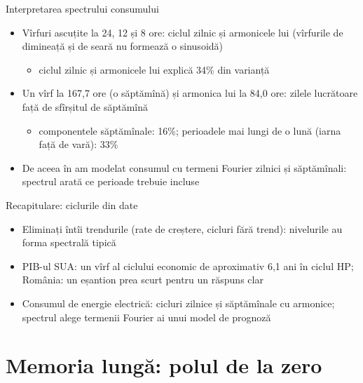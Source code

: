 \begin{frame}{Interpretarea spectrului consumului}
\itemsize{\small}
\begin{itemize}
    \item Vîrfuri ascuțite la 24, 12 și 8 ore: ciclul zilnic și armonicele lui (vîrfurile de dimineață și de seară nu formează o sinusoidă)
    \begin{itemize}
        \item ciclul zilnic și armonicele lui explică 34\% din varianță
    \end{itemize}
    \item Un vîrf la 167{,}7 ore (o săptămînă) și armonica lui la 84{,}0 ore: zilele lucrătoare față de sfîrșitul de săptămînă
    \begin{itemize}
        \item componentele săptămînale: 16\%; perioadele mai lungi de o lună (iarna față de vară): 33\%
    \end{itemize}
    \item De aceea în  am modelat consumul cu termeni Fourier zilnici și săptămînali: spectrul arată ce perioade trebuie incluse
\end{itemize}
\end{frame}

\begin{frame}{Recapitulare: ciclurile din date}
\itemsize{\small}
\begin{itemize}
    \item Eliminați întîi trendurile (rate de creștere, cicluri fără trend): nivelurile au forma spectrală tipică
    \item PIB-ul SUA: un vîrf al ciclului economic de aproximativ 6{,}1 ani în ciclul HP; România: un eșantion prea scurt pentru un răspuns clar
    \item Consumul de energie electrică: cicluri zilnice și săptămînale cu armonice; spectrul alege termenii Fourier ai unui model de prognoză
\end{itemize}
\end{frame}


\section{Memoria lungă: polul de la zero}

